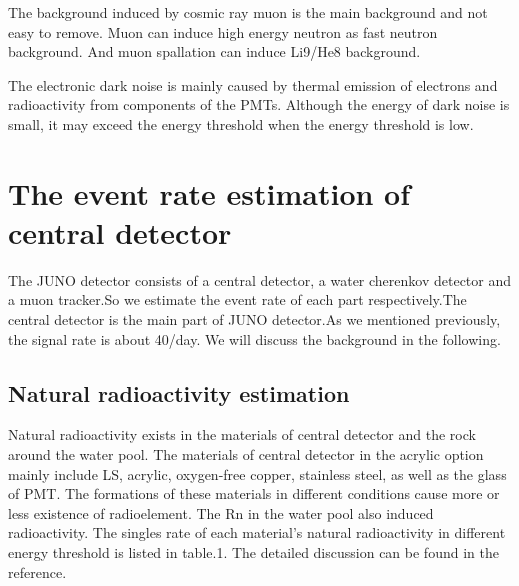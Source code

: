 \documentclass[a4paper,10pt,twoside]{paper}
\begin{document}
\begin{multicols}{2}
		The background induced by cosmic ray muon is the main background
		and not easy to remove. Muon can induce high energy neutron as
		fast neutron background. And muon spallation can induce Li9/He8
		background.

		The electronic dark noise is mainly caused by thermal 
		emission of electrons and radioactivity from components of the 
		PMTs. Although the energy of dark noise is small, it may exceed
		the energy threshold when the energy threshold is low.


		\section{The event rate estimation of central detector}
		The JUNO detector consists of a central detector, a water 
		cherenkov detector and a muon tracker.So we estimate the event
		rate of each part respectively.The central detector is the 
		main part of JUNO detector.As we mentioned previously, 
		the signal
		rate is about 40/day. We will discuss the background in the 
		following.

		\subsection{Natural radioactivity estimation}
		Natural radioactivity exists in the materials of central 
		detector and the rock around the water pool.
		The materials of central detector in the acrylic option mainly
		include LS, acrylic, oxygen-free copper, stainless steel, as
		well as the glass of PMT.
		The formations of these materials in different conditions 
		cause more or less existence of radioelement.
		The Rn in the water pool also induced radioactivity.
		The singles rate of each material's natural radioactivity 
		in different energy threshold is 
		listed in table.1. The detailed discussion can be found in
		the reference\cite{lab10}.

	\end{multicols}
\end{document}
